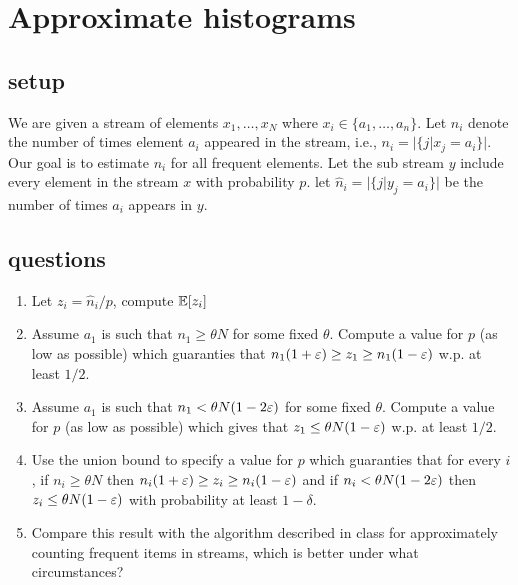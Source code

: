 \documentclass{article}
\begin{document}
\section{Approximate histograms}
\subsection*{setup}
We are given a stream of elements $x_1,\ldots, x_N$ where $x_i \in \{a_1,\ldots,a_n\}$.
Let $n_i$ denote the number of times element $a_i$ appeared in the stream, i.e., $n_i = |\{ j | x_j = a_i \}|$.
Our goal is to estimate $n_i$ for all frequent elements.
Let the sub stream $y$ include every element in the stream $x$ with probability $p$.
let $\hat{n}_i = |\{ j | y_j = a_i \}|$ be the number of times $a_i$ appears in $y$.  
\subsection*{questions}
\begin{enumerate}
\item Let $z_i = \hat{n}_{i}/p$, compute ${\mathbb E}[z_i]$
\item Assume $a_1$ is such that $n_1 \ge \theta N$ for some fixed $\theta$.
Compute a value for $p$ (as low as possible) which guaranties that $n_1 (1+\varepsilon)\ge z_1 \ge n_1 (1-\varepsilon)$ w.p. at least $1/2$. 
\item Assume $a_1$ is such that $n_1 < \theta N(1-2\varepsilon)$ for some fixed $\theta$.
Compute a value for $p$ (as low as possible) which gives that $z_1 \le \theta N(1-\varepsilon)$ w.p. at least $1/2$. 
\item Use the union bound to specify a value for $p$ which guaranties that for every $i$, if $n_i \ge \theta N$
then $n_i (1+\varepsilon)\ge z_i \ge n_i (1-\varepsilon)$ and if $n_i < \theta N (1-2\varepsilon)$ then $z_i \le \theta N (1-\varepsilon)$ with probability at least $1-\delta$. 
\item Compare this result with the algorithm described in class for approximately counting frequent items in streams, which is better under what circumstances?
\end{enumerate}
\end{document}
